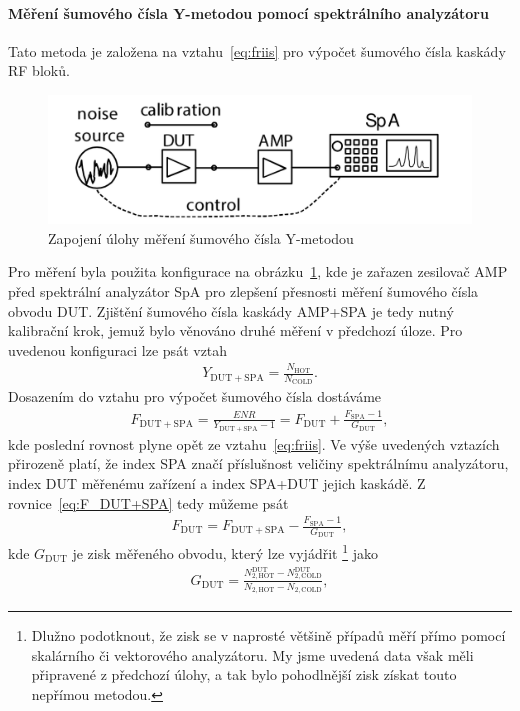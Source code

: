 \documentclass[11pt,a4paper]{article}
\begin{document}
\paragraph*{Měření šumového čísla Y-metodou pomocí spektrálního analyzátoru} Tato metoda je založena na vztahu~\ref{eq:friis} pro výpočet šumového čísla kaskády RF bloků.
\begin{figure}[!ht]
    \centering
    \includegraphics[width=.65\textwidth]{src/task2-zapojeni.png}
    \caption{Zapojení úlohy měření šumového čísla Y-metodou}
    \label{fig:task2-zapojeni}
\end{figure}
Pro měření byla použita konfigurace na obrázku~\ref{fig:task2-zapojeni}, kde je zařazen zesilovač AMP před spektrální analyzátor SpA pro zlepšení přesnosti měření šumového čísla obvodu DUT. Zjištění šumového čísla kaskády AMP+SPA je tedy nutný kalibrační krok, jemuž bylo věnováno druhé měření v předchozí úloze. Pro uvedenou konfiguraci lze psát vztah
\begin{align}
    Y_{\mathrm{DUT+SPA}} = \frac{N_{\mathrm{HOT}}}{N_{\mathrm{COLD}}}.
\end{align}
Dosazením do vztahu pro výpočet šumového čísla dostáváme
\begin{align}
    \label{eq:F_DUT+SPA}
    F_{\mathrm{DUT+SPA}} = \frac{\mathit{ENR}}{Y_{\mathrm{DUT+SPA}}-1} = F_{\mathrm{DUT}} + \frac{F_{\mathrm{SPA}} - 1}{G_{\mathrm{DUT}}},
\end{align}
kde poslední rovnost plyne opět ze vztahu~\ref{eq:friis}. Ve výše uvedených vztazích přirozeně platí, že index SPA značí příslušnost veličiny spektrálnímu analyzátoru, index DUT měřenému zařízení a index SPA+DUT jejich kaskádě. Z rovnice~\ref{eq:F_DUT+SPA} tedy můžeme psát
\begin{align}
    F_{\mathrm{DUT}} = F_{\mathrm{DUT+SPA}} - \frac{F_{\mathrm{SPA}}-1}{G_{\mathrm{DUT}}},
\end{align}
kde $G_{\mathrm{DUT}}$ je zisk měřeného obvodu, který lze vyjádřit%
    \footnote{Dlužno podotknout, že zisk se v naprosté většině případů měří přímo pomocí skalárního či vektorového analyzátoru. My jsme uvedená data však měli připravené z předchozí úlohy, a tak bylo pohodlnější zisk získat touto nepřímou metodou.}
jako
\begin{align}
    G_{\mathrm{DUT}} = \frac{N_{2,\mathrm{HOT}}^{\mathrm{DUT}} - N_{2,\mathrm{COLD}}^{\mathrm{DUT}}}{N_{2,\mathrm{HOT}} - N_{2,\mathrm{COLD}}},
\end{align}
\end{document}
